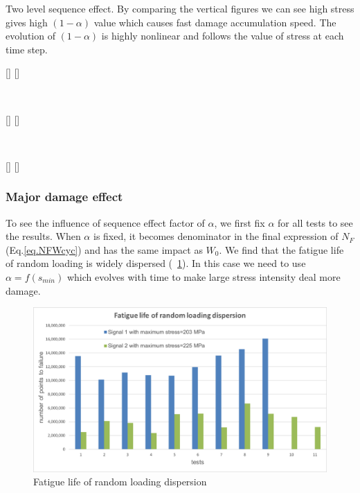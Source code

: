 \documentclass[3p,times,number,review]{elsarticle}
\newcommand{\figref}[1]{\figurename~\ref{#1}}
\begin{document}
\begin{Figure}[]{Two level sequence effect. By comparing the vertical figures we can see high stress gives high $(1-\alpha)$ value which causes fast damage accumulation speed. The evolution of $(1-\alpha)$ is highly nonlinear and follows the value of stress at each time step.}
\centerline{
[]
[]}
\\
\centerline{
[]
[]}
\\
\centerline{
[]
[]}
\label{sequence}
\end{Figure}


\clearpage
\subsubsection{Major damage effect}

To see the influence of sequence effect factor of $\alpha$, we first fix $\alpha$ for all tests to see the results. When $\alpha$ is fixed, it becomes denominator in the final expression of $N_F$ (Eq.\eqref{eq.NFWcyc}) and has the same impact as $W_0$. We find  that the fatigue life of random loading is widely dispersed (\figref{fig.randomdispersion}). In this case we need to use $\alpha=f(s_{min})$ which evolves with time to make large stress intensity deal more damage.

\begin{figure}[!h]
	\centering
	\includegraphics[width=\textwidth]{figures//randomdispersion.png} 
	\caption{Fatigue life of random loading dispersion}
	\label{fig.randomdispersion}
\end{figure}
\end{document}
